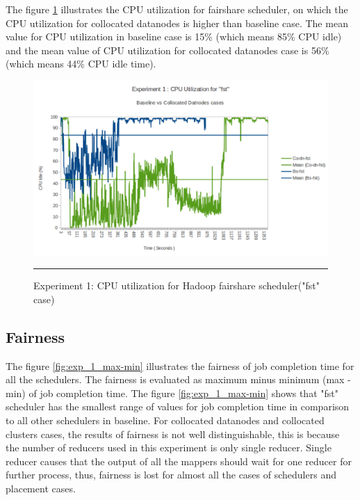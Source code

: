  

The figure \ref{fig:exp1_cpu_fst} illustrates the CPU utilization for fairshare scheduler, on which the CPU utilization for collocated datanodes is higher than baseline case. The mean value for CPU utilization in baseline case is 15\% (which means 85\% CPU idle)  and the mean value of CPU utilization for collocated datanodes case is 56\% (which means 44\% CPU idle time).
  


\begin{figure}[htbp]
  \centering
    \includegraphics[width=\textwidth,height=\textheight,keepaspectratio]{./Figures/exp1_cpu_fst.pdf}
    \rule{35em}{0.5pt}
  \caption{Experiment 1: CPU‌ utilization for Hadoop fairshare scheduler("fst" case)}
  \label{fig:exp1_cpu_fst}
\end{figure}   





\subsection{Fairness }

The figure \ref{fig:exp_1_max-min} illustrates the fairness of job completion time for all the schedulers. The fairness is evaluated as maximum minus minimum (max - min)‌ of job completion time. The figure \ref{fig:exp_1_max-min} shows that "fst" scheduler has the smallest range of values for job completion time in comparison to all other schedulers in baseline. For collocated datanodes and collocated clusters cases, the results of fairness is not well distinguishable, this is because the number of reducers used in this experiment is only single reducer. Single reducer causes that the output of all the mappers should wait for one reducer for further process, thus, fairness is lost for almost all the cases of schedulers and placement cases.    

